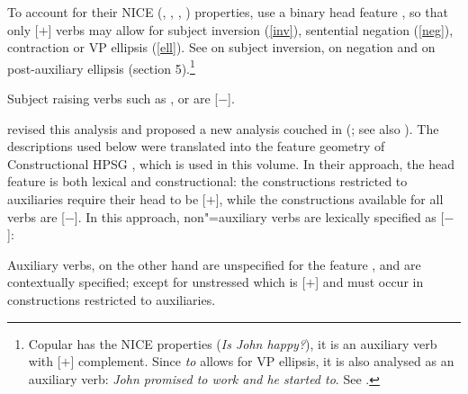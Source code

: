 \documentclass[output=paper
	        ,collection
	        ,collectionchapter
 	        ,biblatex
                ,babelshorthands
                ,newtxmath
                ,draftmode
                ,colorlinks, citecolor=brown
]{langscibook}
\begin{document}
To account for their NICE (, , , ) properties, \citet{KS2002a} %
use a binary head feature \aux, so that only [\aux $+$] verbs may allow for subject inversion (\ref{inv}), sentential negation (\ref{neg}), contraction or VP ellipsis (\ref{ell}). See   on subject inversion,  on negation and  on post-auxiliary ellipsis (section 5).\footnote{Copular  has the NICE properties (\textit{Is John happy?}), it is an auxiliary verb with [\prd $+$] complement. Since \emph{to} allows for VP ellipsis, it is also analysed as an auxiliary verb: \emph{John promised to work and he started to}. See .}

\eal
{}
\zl

\noindent
Subject raising verbs such as ,  or  are [\aux $-$].

\citet{Sagetal2020} revised this analysis and proposed a new analysis couched in \sbcg (\citealp{Sag2012a}; see also ). The descriptions used below were translated into the feature geometry of Constructional HPSG \citep{Sag97a}, which is used in this volume. In their approach, the head feature \aux is both lexical and constructional: the constructions restricted to auxiliaries require their head to be [\aux $+$], while the constructions available for all verbs are [\aux $-$]. In this approach, non"=auxiliary verbs are lexically specified as [\aux $-$]:

\begin{exe}
\ex {} \impl
{}
\end{exe}

 Auxiliary verbs, on the other hand are unspecified for the feature \aux, and are contextually specified; except for unstressed   which is [\aux $+$] and must occur in constructions restricted to auxiliaries.

\eal
{}
 \label{inv1}
\label{inv2}
\zl
\end{document}
